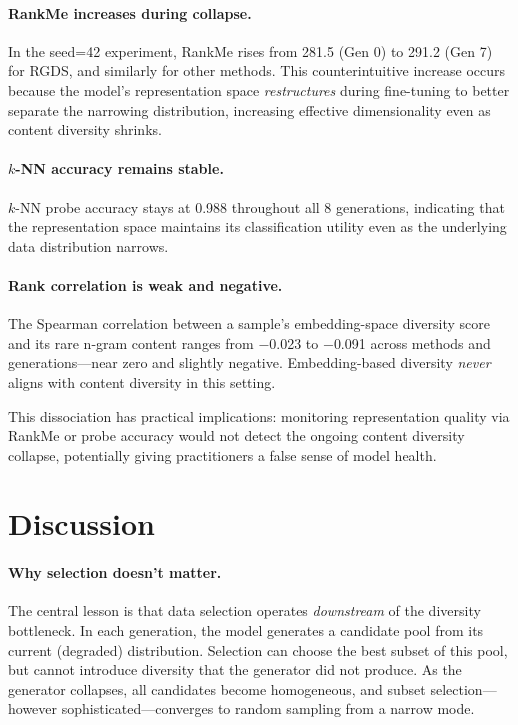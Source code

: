 \documentclass[11pt]{article}
\begin{document}
\paragraph{RankMe increases during collapse.} In the seed=42 experiment, RankMe rises from 281.5 (Gen 0) to 291.2 (Gen 7) for RGDS, and similarly for other methods. This counterintuitive increase occurs because the model's representation space \emph{restructures} during fine-tuning to better separate the narrowing distribution, increasing effective dimensionality even as content diversity shrinks.

\paragraph{$k$-NN accuracy remains stable.} $k$-NN probe accuracy stays at 0.988 throughout all 8 generations, indicating that the representation space maintains its classification utility even as the underlying data distribution narrows.

\paragraph{Rank correlation is weak and negative.} The Spearman correlation between a sample's embedding-space diversity score and its rare n-gram content ranges from $-$0.023 to $-$0.091 across methods and generations---near zero and slightly negative. Embedding-based diversity \emph{never} aligns with content diversity in this setting.

This dissociation has practical implications: monitoring representation quality via RankMe or probe accuracy would not detect the ongoing content diversity collapse, potentially giving practitioners a false sense of model health.

\section{Discussion}

\paragraph{Why selection doesn't matter.}
The central lesson is that data selection operates \emph{downstream} of the diversity bottleneck. In each generation, the model generates a candidate pool from its current (degraded) distribution. Selection can choose the best subset of this pool, but cannot introduce diversity that the generator did not produce. As the generator collapses, all candidates become homogeneous, and subset selection---however sophisticated---converges to random sampling from a narrow mode.
\end{document}
